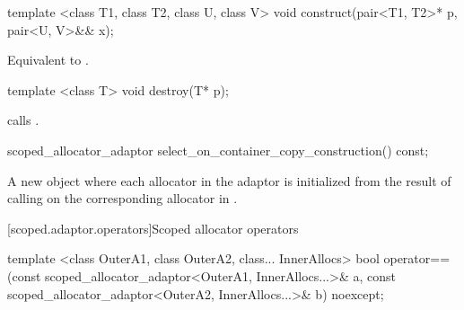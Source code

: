 %
%
\begin{itemdecl}
template <class T1, class T2, class U, class V>
  void construct(pair<T1, T2>* p, pair<U, V>&& x);
\end{itemdecl}

\begin{itemdescr}
\pnum
\effects Equivalent to .
\end{itemdescr}

%
\begin{itemdecl}
template <class T>
  void destroy(T* p);
\end{itemdecl}

\begin{itemdescr}
\pnum
\effects calls .
\end{itemdescr}

%
%
\begin{itemdecl}
scoped_allocator_adaptor select_on_container_copy_construction() const;
\end{itemdecl}

\begin{itemdescr}
\pnum
\returns A new  object where each allocator  in the
adaptor is initialized from the result of calling
 on the
corresponding allocator in .
\end{itemdescr}

[scoped.adaptor.operators]{Scoped allocator operators}

%
%
\begin{itemdecl}
template <class OuterA1, class OuterA2, class... InnerAllocs>
  bool operator==(const scoped_allocator_adaptor<OuterA1, InnerAllocs...>& a,
                  const scoped_allocator_adaptor<OuterA2, InnerAllocs...>& b) noexcept;
\end{itemdecl}

